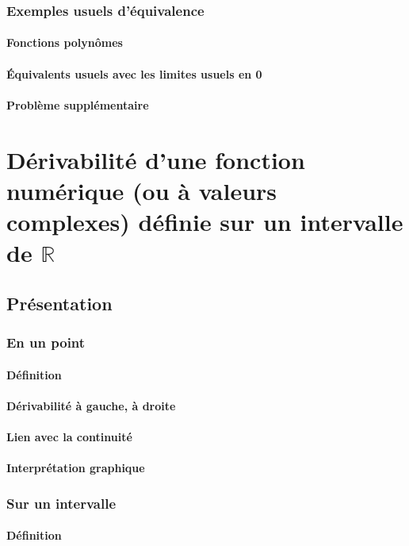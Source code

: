 \documentclass[12pt,a4paper,french]{book}
\begin{document}
		\subsection{Exemples usuels d'équivalence}
			\subsubsection{Fonctions polynômes}
			\subsubsection{Équivalents usuels avec les limites usuels en 0}
			\subsubsection{Problème supplémentaire}

\chapter{Dérivabilité d'une fonction numérique (ou à valeurs complexes) définie sur un intervalle de $\mathbb{R}$}
	\section{Présentation}
		\subsection{En un point}
			\subsubsection{Définition}
			\subsubsection{Dérivabilité à gauche, à droite}
			\subsubsection{Lien avec la continuité}
			\subsubsection{Interprétation graphique}
		\subsection{Sur un intervalle}
			\subsubsection{Définition}
\end{document}
